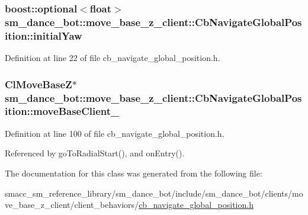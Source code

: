 \subsubsection[{\texorpdfstring{initial\+Yaw}{initialYaw}}]{\setlength{\rightskip}{0pt plus 5cm}boost\+::optional$<$float$>$ sm\+\_\+dance\+\_\+bot\+::move\+\_\+base\+\_\+z\+\_\+client\+::\+Cb\+Navigate\+Global\+Position\+::initial\+Yaw}\hypertarget{classsm__dance__bot_1_1move__base__z__client_1_1CbNavigateGlobalPosition_a2466eeabb6e2a3f35427a444a369d45e}{}\label{classsm__dance__bot_1_1move__base__z__client_1_1CbNavigateGlobalPosition_a2466eeabb6e2a3f35427a444a369d45e}


Definition at line 22 of file cb\+\_\+navigate\+\_\+global\+\_\+position.\+h.

\subsubsection[{\texorpdfstring{move\+Base\+Client\+\_\+}{moveBaseClient_}}]{\setlength{\rightskip}{0pt plus 5cm}Cl\+Move\+BaseZ$\ast$ sm\+\_\+dance\+\_\+bot\+::move\+\_\+base\+\_\+z\+\_\+client\+::\+Cb\+Navigate\+Global\+Position\+::move\+Base\+Client\+\_\+\hspace{0.3cm}{\ttfamily [private]}}\hypertarget{classsm__dance__bot_1_1move__base__z__client_1_1CbNavigateGlobalPosition_a301398c07738d6680e163782d35365c5}{}\label{classsm__dance__bot_1_1move__base__z__client_1_1CbNavigateGlobalPosition_a301398c07738d6680e163782d35365c5}


Definition at line 100 of file cb\+\_\+navigate\+\_\+global\+\_\+position.\+h.



Referenced by go\+To\+Radial\+Start(), and on\+Entry().



The documentation for this class was generated from the following file\+:\begin{DoxyCompactItemize}
\item 
smacc\+\_\+sm\+\_\+reference\+\_\+library/sm\+\_\+dance\+\_\+bot/include/sm\+\_\+dance\+\_\+bot/clients/move\+\_\+base\+\_\+z\+\_\+client/client\+\_\+behaviors/\hyperlink{smacc__sm__reference__library_2sm__dance__bot_2include_2sm__dance__bot_2clients_2move__base__z__4f98f2fc60ce0041c06779ddc6689af4}{cb\+\_\+navigate\+\_\+global\+\_\+position.\+h}\end{DoxyCompactItemize}
